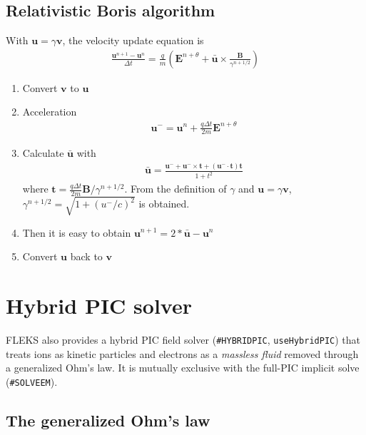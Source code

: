 \documentclass[a4paper, 11pt]{article}
\begin{document}
\subsection{Relativistic Boris algorithm}

With $\mathbf{u} = \gamma \mathbf{v}$, the velocity update equation is
\begin{eqnarray}
\frac{\mathbf{u}^{n+1} - \mathbf{u}^{n}}{\Delta t} = \frac{q}{m}(\mathbf{E}^{n+\theta} + \bar{\mathbf{u}}\times \frac{\mathbf{B}}{\gamma ^{n+1/2}})
\end{eqnarray}

\begin{enumerate}
    \item Convert $\mathbf{v}$ to $\mathbf{u}$
    \item Acceleration
\begin{eqnarray}
    \mathbf{u}^- = \mathbf{u}^{n} + \frac{q\Delta t}{2m}\mathbf{E}^{n+\theta}
\end{eqnarray}

\item Calculate $\bar{\mathbf{u}}$ with
\begin{eqnarray}
\bar{\mathbf{u}} = \frac{\mathbf{u}^- + \mathbf{u}^- \times \mathbf{t} + (\mathbf{u}^- \cdot \mathbf{t})\mathbf{t}}{1+t^2}
\end{eqnarray}
where $\mathbf{t} = \frac{q\Delta t}{2m} \mathbf{B}/\gamma^{n+1/2}$. From the definition of $\gamma$ and $\mathbf{u} = \gamma \mathbf{v}$, $\gamma ^{n+1/2} = \sqrt{1+(u^-/c)^2}$ is obtained. 

\item Then it is easy to obtain $\mathbf{u}^{n+1} = 2*\bar{\mathbf{u}} - \mathbf{u}^{n}$
\item  Convert $\mathbf{u}$ back to $\mathbf{v}$
\end{enumerate}

\section{Hybrid PIC solver}

FLEKS also provides a hybrid PIC field solver (\texttt{\#HYBRIDPIC},
\texttt{useHybridPIC}) that treats ions as kinetic particles and electrons as a
\emph{massless fluid} removed through a generalized Ohm's law. It is mutually
exclusive with the full-PIC implicit solve (\texttt{\#SOLVEEM}).

\subsection{The generalized Ohm's law}
\end{document}
